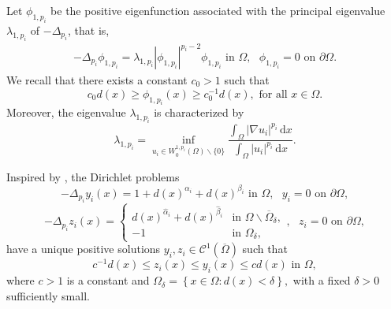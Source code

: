 \documentclass[11pt]{amsart}
\theoremstyle{definition}
\theoremstyle{remark}
\numberwithin{equation}{section}
\begin{document}
Let $\phi _{1,p_{i}}$ be the positive eigenfunction associated with the
principal eigenvalue $\lambda _{1,p_{i}}$ of $-\Delta _{p_{i}}$, that is,%
\begin{equation}
\begin{array}{c}
-\Delta _{p_{i}}\phi _{1,p_{i}}=\lambda _{1,p_{i}}|\phi
_{1,p_{i}}|^{p_{i}-2}\phi _{1,p_{i}}\text{ \ in }\Omega ,\text{ \ }\phi
_{1,p_{i}}=0\text{ \ on }\partial \Omega .%
\end{array}
\label{1}
\end{equation}%
We recall that there exists a constant $c_{0}>1$ such that%
\begin{equation}
c_{0}d(x)\geq \phi _{1,p_{i}}(x)\geq c_{0}^{-1}d(x),\text{ for all }x\in
\Omega .  \label{2}
\end{equation}%
Moreover, the eigenvalue $\lambda _{1,p_{i}}$ is characterized by 
\begin{equation}
\lambda _{1,p_{i}}=\inf_{u_{i}\in W_{0}^{1,p_{i}}(\Omega )\backslash \{0\}} 
\frac{\int_{\Omega }|\nabla u_{i}|^{p_{i}}\,\mathrm{d}x}{\int_{\Omega
}|u_{i}|^{p_{i}}\,\mathrm{d}x}.  \label{3}
\end{equation}

Inspired by \cite{DM}, the Dirichlet problems 
\begin{equation}
-\Delta _{p_{i}}y_{i}(x)=1+d(x)^{\alpha _{i}}+d(x)^{\beta _{i}}\text{ in }%
\Omega ,\text{ \ }y_{i}=0\text{ on }\partial \Omega ,  \label{4}
\end{equation}%
\begin{equation}
-\Delta _{p_{i}}z_{i}(x)=\left\{ 
\begin{array}{ll}
d(x)^{\hat{\alpha}_{i}}+d(x)^{\hat{\beta}_{i}} & \text{in \ }\Omega
\backslash \overline{\Omega }_{\delta }, \\ 
-1 & \text{in \ }\Omega _{\delta },%
\end{array}%
\right. ,\text{ \ }z_{i}=0\text{ \ on }\partial \Omega ,  \label{5}
\end{equation}%
have a unique positive solutions $y_{i},z_{i}\in \mathcal{C}^{1}\left( 
\overline{\Omega }\right) $ such that 
\begin{equation}
c^{-1}d(x)\leq z_{i}(x)\leq y_{i}(x)\leq cd(x)\text{ in }\Omega ,  \label{6}
\end{equation}%
where $c>1$ is a constant and $\Omega _{\delta }=\left\{ x\in \Omega
:d(x)<\delta \right\} ,$ with a fixed $\delta >0$ sufficiently small.
\end{document}
